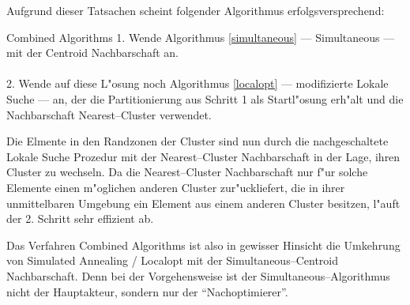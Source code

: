 Aufgrund dieser Tatsachen scheint folgender Algorithmus erfolgsversprechend:

\begin{algorithm}{Combined Algorithms}
	1. Wende Algorithmus \ref{simultaneous} --- Simultaneous --- mit der
	Centroid Nachbarschaft an.\\
	\\
	2. Wende auf diese L"osung noch Algorithmus \ref{localopt} --- 
	modifizierte Lokale Suche --- an, der die Partitionierung aus
	Schritt 1 als Startl"osung erh"alt und die Nachbarschaft
	Nearest--Cluster verwendet.
\end{algorithm}

Die Elmente in den Randzonen der Cluster sind nun durch die nachgeschaltete
Lokale Suche Prozedur mit der Nearest--Cluster Nachbarschaft in der Lage,
ihren Cluster zu wechseln. Da die Nearest--Cluster Nachbarschaft nur f"ur 
solche Elemente einen m"oglichen anderen Cluster zur"uckliefert, die
in ihrer unmittelbaren Umgebung ein Element aus einem anderen Cluster
besitzen, l"auft der 2. Schritt sehr effizient ab.

Das Verfahren Combined Algorithms ist also in gewisser Hinsicht die
Umkehrung von Simulated Annealing / Localopt mit der
Simultaneous--Centroid Nachbarschaft.
Denn bei der Vorgehensweise ist der Simultaneous--Algorithmus nicht der 
Hauptakteur, sondern nur der "`Nachoptimierer"'.

